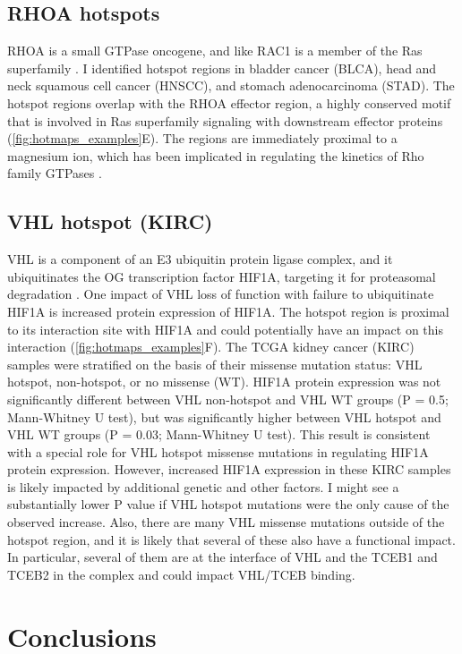\subsection{RHOA hotspots}
RHOA is a small GTPase oncogene, and like RAC1 is a member of the Ras superfamily \cite{RN127}. I identified hotspot regions in bladder cancer (BLCA), head and neck squamous cell cancer (HNSCC), and stomach adenocarcinoma (STAD). The hotspot regions overlap with the RHOA effector region, a highly conserved motif that is involved in Ras superfamily signaling with downstream effector proteins (\autoref{fig:hotmaps_examples}E). The regions are immediately proximal to a magnesium ion, which has been implicated in regulating the kinetics of Rho family GTPases \cite{RN128}.

\subsection{VHL hotspot (KIRC)}
VHL is a component of an E3 ubiquitin protein ligase complex, and it ubiquitinates the OG transcription factor HIF1A, targeting it for proteasomal degradation \cite{RN129}. One impact of VHL loss of function with failure to ubiquitinate HIF1A is increased protein expression of HIF1A. The hotspot region is proximal to its interaction site with HIF1A and could potentially have an impact on this interaction (\autoref{fig:hotmaps_examples}F). The TCGA kidney cancer (KIRC) samples were stratified on the basis of their missense mutation status: VHL hotspot, non-hotspot, or no missense (WT). HIF1A protein expression was not significantly different between VHL non-hotspot and VHL WT groups (P = 0.5; Mann-Whitney U test), but was significantly higher between VHL hotspot and VHL WT groups (P = 0.03; Mann-Whitney U test). This result is consistent with a special role for VHL hotspot missense mutations in regulating HIF1A protein expression. However, increased HIF1A expression in these KIRC samples is likely impacted by additional genetic and other factors. I might see a substantially lower P value if VHL hotspot mutations were the only cause of the observed increase. Also, there are many VHL missense mutations outside of the hotspot region, and it is likely that several of these also have a functional impact. In particular, several of them are at the interface of VHL and the TCEB1 and TCEB2 in the complex and could impact VHL/TCEB binding.

\section{Conclusions}

